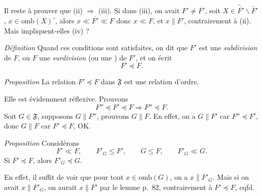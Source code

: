 \documentclass[11pt,a4paper]{article}
\begin{document}
 Il reste à prouver que (ii) $\Longrightarrow$ (iii).  Si dans (iii), on avait $F' \neq \overline{F'}$, soit $X \in \widetilde{\overline{F'}} \smallsetminus \widetilde{F'}$, $x \in \mathrm{omb}(X)^{\circ}$, alors $x \ll \overline{F'} \ll F$ donc $x \ll F$, et $x \parallel F'$, contrairement à (ii).  Mais impliquent-elles (iv) ?

\emph{Définition} Quand ces conditions sont satisfaites, on dit que $F'$ est une \emph{subdivision} de $F$, ou $F$ une \emph{surdivision} (ou une \emph{}) de $F'$, et on écrit
\[
  F' \preccurlyeq F .
\]


\emph{Proposition} La relation $F' \preccurlyeq F$ dans $\mathfrak{F}$ est une relation d'ordre.

Elle est évidemment réflexive. Prouvons
\[
  F'' \preccurlyeq F' \preccurlyeq F \Longrightarrow F'' \preccurlyeq F .
\]
Soit  $G \in \mathfrak{F}$, supposons $G \parallel F''$, prouvons $G \parallel F$. En effet, on a $G \parallel F'$ car $F'' \preccurlyeq F'$, donc $G \parallel F$ car $F' \preccurlyeq F$, OK.

\emph{Proposition} Considérons
\[
  F' \ll F, \qquad F'_G \leq F', \qquad G \leq F, \qquad F'_G \ll G .
\]
Si $F' \preccurlyeq F$, alors $F'_G \preccurlyeq G$.

En effet,  il suffit de voir que pour  tout $x \in \mathrm{omb}(G)$, on a $x \mathrel{\overline{\parallel}} F'_G$. Mais si on avait $x \parallel F'_G$, on aurait $x \parallel F'$ par le lemme p.~82, contrairement à $F' \preccurlyeq F$, cqfd.
\end{document}
